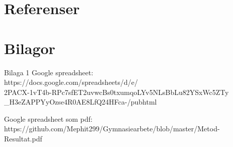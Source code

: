 \documentclass[11p]{article}
\begin{document}
\begin{otherlanguage}{swedish}
    \newpage
    \section{Referenser}

    \printbibliography[heading=none]

    \newpage
    \section{Bilagor}
    Bilaga 1
    Google spreadsheet:
    \\https://docs.google.com/spreadsheets/d/e/
    \\2PACX-1vT4b-RPc7sfET2uvwcBs0txumqoLYv5NLsBbLu82YSxWc5ZTy
    \\_H3eZAPPYyOzse4R0AE8LfQ24HFca-/pubhtml %

    Google spreadsheet som pdf:
    \\https://github.com/Mephit299/Gymnasiearbete/blob/master/Metod-Resultat.pdf

    \end{otherlanguage}
\end{document}
